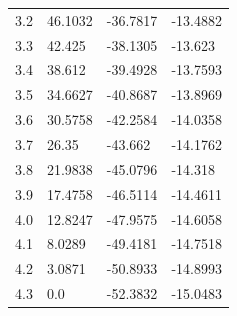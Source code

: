 \begin{tabular}{llll}
3.2 & 46.1032 & -36.7817 & -13.4882 \\
3.3 & 42.425 & -38.1305 & -13.623 \\
3.4 & 38.612 & -39.4928 & -13.7593 \\
3.5 & 34.6627 & -40.8687 & -13.8969 \\
3.6 & 30.5758 & -42.2584 & -14.0358 \\
3.7 & 26.35 & -43.662 & -14.1762 \\
3.8 & 21.9838 & -45.0796 & -14.318 \\
3.9 & 17.4758 & -46.5114 & -14.4611 \\
4.0 & 12.8247 & -47.9575 & -14.6058 \\
4.1 & 8.0289 & -49.4181 & -14.7518 \\
4.2 & 3.0871 & -50.8933 & -14.8993 \\
4.3 & 0.0 & -52.3832 & -15.0483 \\
\bottomrule
\end{tabular}
